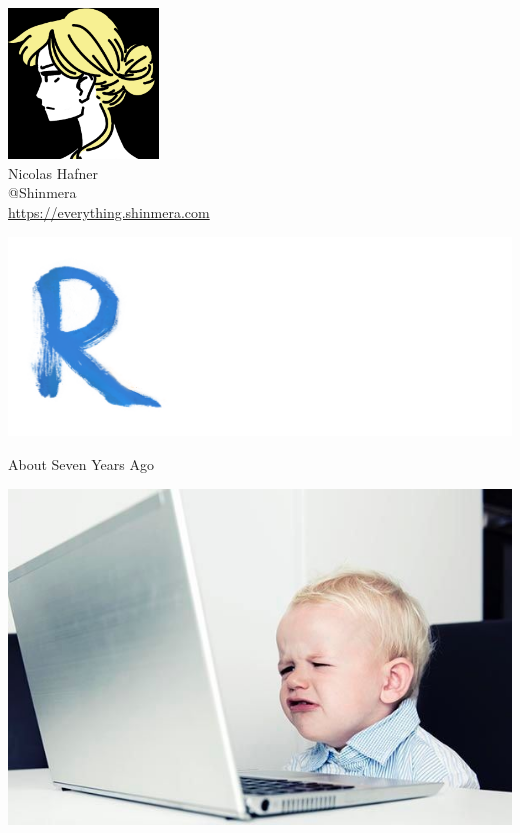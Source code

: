 \documentclass[14pt,t]{beamer}
\renewcommand{\title}[1]{
  {\huge #1} \vskip 0.4cm
}
\begin{document}
\begin{frame}
  \begin{center}
    \includegraphics[height=4cm]{avatar.png}\\
    \vspace{0.2cm}
    {\LARGE Nicolas Hafner} \\
    \vspace{0.2cm}
    {\Large @Shinmera} \\
    \vspace{0.2cm}
    \url{https://everything.shinmera.com}
  \end{center}
\end{frame}

\begin{frame}
  \begin{center}
    \includegraphics[width=0.8\columnwidth]{radiance.png}
  \end{center}
\end{frame}

\begin{frame}
  \title{About Seven Years Ago}
  \begin{center}
    \includegraphics[width=0.8\columnwidth]{baby-at-computer.jpg}
  \end{center}
\end{frame}
\end{document}

